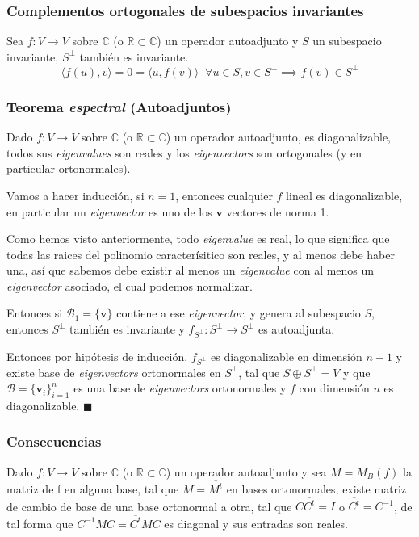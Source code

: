\documentclass{preset}
\newcommand{\compconj}[1]{%
  \overline{#1}%
}
\begin{document}
\vspace{-15pt}
\subsubsection{Complementos ortogonales de subespacios invariantes}

Sea $f: V \rightarrow V$ sobre $\mathbb{C}$ (o $\mathbb{R} \subset \mathbb{C}$) un operador autoadjunto y $S$ un subespacio invariante, $S^\perp$ también es invariante.
\[\langle f(u) {,} v \rangle = 0 = \langle u {,} f(v) \rangle \;\; \forall u \in S, v \in S^\perp \implies f(v) \in S^\perp\]

\vspace{-15pt}
\subsubsection{Teorema \textit{espectral} (Autoadjuntos)}
Dado $f: V \rightarrow V$ sobre $\mathbb{C}$ (o $\mathbb{R} \subset \mathbb{C}$) un operador autoadjunto, es diagonalizable, todos sus \textit{eigenvalues} son reales y los \textit{eigenvectors} son ortogonales (y en particular ortonormales).

Vamos a hacer inducción, si $n = 1$, entonces cualquier $f$ lineal es diagonalizable, en particular un \textit{eigenvector} es uno de los $\textbf{v}$ vectores de norma 1.

Como hemos visto anteriormente, todo \textit{eigenvalue} es real, lo que significa que todas las raices del polinomio caracterísitico son reales, y al menos debe haber una, así que sabemos debe existir al menos un \textit{eigenvalue} con al menos un \textit{eigenvector} asociado, el cual podemos normalizar.

Entonces si $\mathcal{B}_1=\{\textbf{v}\}$ contiene a ese \textit{eigenvector}, y genera al subespacio $S$, entonces $S^\perp$ también es invariante y $f_{S^\perp}: S^\perp \rightarrow S^\perp$ es autoadjunta.

Entonces por hipótesis de inducción, $f_{S^\perp}$ es diagonalizable en dimensión $n-1$ y existe base de \textit{eigenvectors} ortonormales en $S^\perp$, tal que $S \oplus S^\perp = V$ y que $\mathcal{B}=\{\textbf{v}_i\}_{i=1}^n$ es una base de \textit{eigenvectors} ortonormales y $f$ con dimensión $n$ es diagonalizable.  $\blacksquare$

\vspace{-15pt}
\subsubsection{Consecuencias}
\vspace{-10pt}
Dado $f: V \rightarrow V$ sobre $\mathbb{C}$ (o $\mathbb{R} \subset \mathbb{C}$) un operador autoadjunto y sea $M=M_B(f)$ la matriz de f en alguna base, tal que $M=\compconj{M^t}$ en bases ortonormales, existe matriz de cambio de base de una base ortonormal a otra, tal que $C\compconj{C^t}=I$ o $\compconj{C^t}=C^{-1}$, de tal forma que $C^{-1}MC=\compconj{C^t}MC$ es diagonal y sus entradas son reales.
\end{document}

